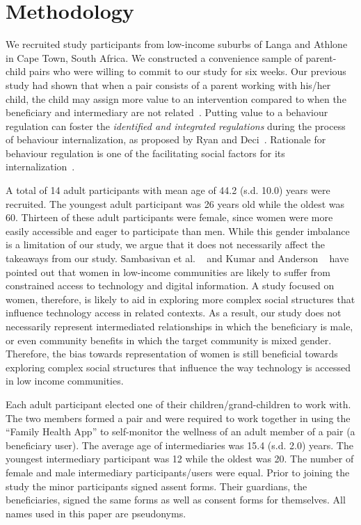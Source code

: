 \documentclass{sig-alternate}
\begin{document}
\section{Methodology}
We recruited study participants from low-income suburbs of Langa and Athlone in Cape Town, South Africa. We constructed a convenience sample of parent-child pairs who were willing to commit to our study for six weeks. Our previous study had shown that when a pair consists of a parent working with his/her child, the child may assign more value to an intervention compared to when the beneficiary and intermediary are not related~\cite{katule2016:leveraging}. Putting value to a behaviour regulation can foster the \emph{identified and integrated regulations} during the process of behaviour internalization, as proposed by Ryan and Deci~\cite{ryan2000intrinsic}. Rationale for behaviour regulation is one of the facilitating social factors for  its internalization~\cite{deci1994facilitating}. 

A total of 14 adult participants with mean age of 44.2 (s.d. 10.0) years were recruited.  The youngest adult participant was 26 years old while the oldest was 60. Thirteen of these adult participants were female, since women were more easily accessible and eager to participate than men. While this gender imbalance is a limitation of our study, we argue that it does not necessarily affect the takeaways from our study. Sambasivan et al. ~\cite{sambasivan2010} and Kumar and Anderson ~\cite{kumar2015mobile} have pointed out that women in low-income communities are likely to suffer from constrained access to technology and digital information. A study focused on women, therefore, is likely to aid in exploring more complex social structures that influence technology access in related contexts. As a result, our study does not necessarily represent intermediated relationships in which the beneficiary is male, or even community benefits in which the target community is mixed gender. Therefore, the bias towards representation of women is still beneficial towards exploring complex social structures that influence the way technology is accessed in low income communities.

Each adult participant elected one of their children/grand-children to work with. The two members formed a pair and were required to work together in using the ``Family Health App'' to self-monitor the wellness of an adult member of a pair (a beneficiary user). The average age of intermediaries was 15.4 (s.d. 2.0) years. The youngest intermediary participant was 12 while the oldest was 20. The number of female and male intermediary participants/users were equal. Prior to joining the study the minor participants signed assent forms. Their guardians, the beneficiaries, signed the same forms as well as consent forms for themselves. All names used in this paper are pseudonyms.
  
\end{document}
